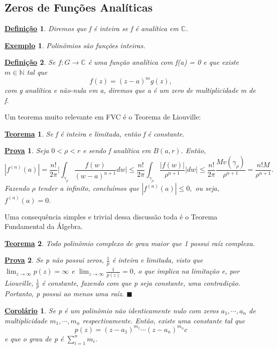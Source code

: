 \documentclass{article}
\newtheorem*{def*}{\underline{Defini\c c\~ao}}
\newtheorem*{theorem*}{\underline{Teorema}}
\newtheorem{example}{\underline{Exemplo}}[section]
\newtheorem*{proof*}{\underline{Prova}}
\newtheorem*{crl*}{\underline{Corol\'ario}}
\renewcommand\qedsymbol{$\blacksquare$}
\begin{document}
  \subsection{Zeros de Fun\c c\~oes Anal\'iticas}
  \begin{def*}
    Diremos que f \'e inteira se f \'e anal\'itica em $\mathbb{C}$.
  \end{def*}
  \begin{example}
    Polin\^omios s\~ao fun\c c\~oes inteiras.
  \end{example}
  \begin{def*}
    Se $f:G\rightarrow \mathbb{C}$ \'e uma fun\c c\~ao anal\'itica com f(a) = 0 e que existe $m\in \mathbb{N}$ tal que 
    $$
    f(z) = (z-a)^{m}g(z),
    $$
    com g anal\'itica e n\~ao-nula em a, diremos que a \'e um zero de multiplicidade m de f.
  \end{def*}
  Um teorema muito relevante em FVC \'e o Teorema de Liouville:
  \begin{theorem*}
    Se f \'e inteira e limitada, ent\~ao f \'e constante.
  \end{theorem*}
  \begin{proof*}
    Seja $0 < \rho < r$ e sendo f anal\'itica em $B(a, r)$. Ent\~ao, 
    $$
    |f^{(n)}(a)| = \frac{n!}{2 \pi}\biggl|\int_{\gamma_{\rho}}^{}\frac{f(w)}{(w-a)^{n+1}}dw\biggr|
    \leq \frac{n!}{2\pi}\int_{\gamma_{\rho}}^{}\frac{|f(w)|}{\rho^{n+1}}|dw| \leq \frac{n!}{2\pi}\frac{Mv(\gamma_{\rho})}{\rho^{n+1}} = \frac{n!M}{\rho^{n+1}}.
    $$
    Fazendo $\rho$ tender a infinito, conclu\'imos que $|f^{(n)}(a)|\leq0,$ ou seja, $f^{(n)}(a) = 0.$
  \end{proof*}
  Uma consequ\^encia simples e trivial dessa discuss\~ao toda \'e o Teorema Fundamental da \'Algebra.
  \begin{theorem*}
    Todo polin\^omio complexo de grau maior que 1 possui ra\'iz complexa. 
  \end{theorem*}
  \begin{proof*}
    Se p n\~ao possui zeros, $\frac{1}{p}$ \'e inteira e limitada, visto que $\lim_{z\to\infty}p(z) = \infty$ e $\lim_{z\to\infty}\frac{1}{p(z)} = 0$, 
    o que implica na limita\c c\~ao e, por Liouville, $\frac{1}{p}$ \'e constante, fazendo com que p seja constante, uma contradi\c c\~ao.
    Portanto, p possui ao menos uma ra\'iz. \qedsymbol
  \end{proof*}
  \begin{crl*}
    Se p \'e um polin\^omio n\~ao identicamente nulo com zeros $a_1, \cdots, a_{n}$ de multiplicidade $m_1, \cdots, m_{n}$ respectivamente. Ent\~ao,
    existe uma constante tal que 
    $$
    p(z) = (z-a_1)^{m_1}\cdots(z-a_{n})^{m_{n}}c
    $$
    e que o grau de p \'e $\sum\limits_{i=1}^{n}m_{i}$.
  \end{crl*}
  \newpage
\end{document}
